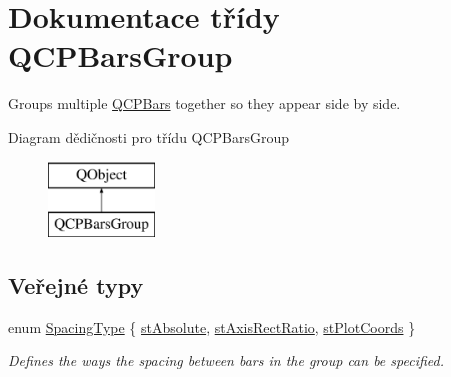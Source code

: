 \hypertarget{classQCPBarsGroup}{}\section{Dokumentace třídy Q\+C\+P\+Bars\+Group}
\label{classQCPBarsGroup}


Groups multiple \hyperlink{classQCPBars}{Q\+C\+P\+Bars} together so they appear side by side.  


Diagram dědičnosti pro třídu Q\+C\+P\+Bars\+Group\begin{figure}[H]
\begin{center}
\leavevmode
\includegraphics[height=2.000000cm]{classQCPBarsGroup}
\end{center}
\end{figure}
\subsection*{Veřejné typy}
\begin{DoxyCompactItemize}
\item 
enum \hyperlink{classQCPBarsGroup_a4c0521120a97e60bbca37677a37075b6}{Spacing\+Type} \{ \hyperlink{classQCPBarsGroup_a4c0521120a97e60bbca37677a37075b6ab53fa3efaf14867dd0f14d41d64e42ac}{st\+Absolute}, 
\hyperlink{classQCPBarsGroup_a4c0521120a97e60bbca37677a37075b6ae94b05c27bc985dcdd8b1e1b7f163d26}{st\+Axis\+Rect\+Ratio}, 
\hyperlink{classQCPBarsGroup_a4c0521120a97e60bbca37677a37075b6ad369cee6287e0a86e8c2b643a3168c54}{st\+Plot\+Coords}
 \}\begin{DoxyCompactList}\small\item\em Defines the ways the spacing between bars in the group can be specified. \end{DoxyCompactList}
\end{DoxyCompactItemize}
